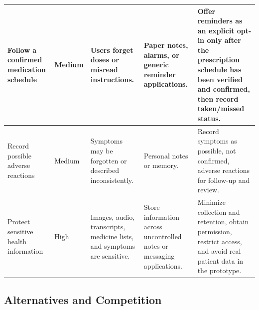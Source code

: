 \begin{longtable}{|L{0.21\textwidth}|L{0.09\textwidth}|L{0.20\textwidth}|L{0.20\textwidth}|L{0.20\textwidth}|}
Follow a confirmed medication schedule & Medium & Users forget doses or misread instructions. & Paper notes, alarms, or generic reminder applications. & Offer reminders as an explicit opt-in only after the prescription schedule has been verified and confirmed, then record taken/missed status.\\ \hline
Record possible adverse reactions & Medium & Symptoms may be forgotten or described inconsistently. & Personal notes or memory. & Record symptoms as possible, not confirmed, adverse reactions for follow-up and review.\\ \hline
Protect sensitive health information & High & Images, audio, transcripts, medicine lists, and symptoms are sensitive. & Store information across uncontrolled notes or messaging applications. & Minimize collection and retention, obtain permission, restrict access, and avoid real patient data in the prototype.\\ \hline
\end{longtable}

\subsection{Alternatives and Competition}

